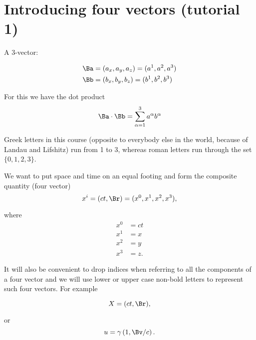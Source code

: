 %
%
\section{Introducing four vectors (tutorial 1)}

A 3-vector: 

\begin{align}\label{eqn:relativisticElectrodynamicsT1:10}
\Ba &= (a_x, a_y, a_z) = (a^1, a^2, a^3) \\
\Bb &= (b_x, b_y, b_z) = (b^1, b^2, b^3)
\end{align}

For this we have the dot product
\begin{equation}\label{eqn:relativisticElectrodynamicsT1:20}
\Ba \cdot \Bb = \sum_{\alpha=1}^3 a^\alpha b^\alpha
\end{equation}

Greek letters in this course (opposite to everybody else in the world, because of Landau and Lifshitz) run from 1 to 3, whereas roman letters run through the set $\{0,1,2,3\}$.

We want to put space and time on an equal footing and form the composite quantity (four vector) 
\begin{equation}\label{eqn:relativisticElectrodynamicsT1:40}
x^i = (ct, \Br) = (x^0, x^1, x^2, x^3),
\end{equation}

where
\begin{align}\label{eqn:relativisticElectrodynamicsT1:80}
x^0 &= ct \\
x^1 &= x \\
x^2 &= y \\
x^3 &= z.
\end{align}

It will also be convenient to drop indices when referring to all the components of a four vector and we will use lower or upper case non-bold letters to represent such four vectors.  For example

\begin{equation}\label{eqn:relativisticElectrodynamicsT1:81}
X = (ct, \Br),
\end{equation}

or
\begin{equation}\label{eqn:relativisticElectrodynamicsT1:82}
u = \gamma \left(1, \Bv/c \right).
\end{equation}

